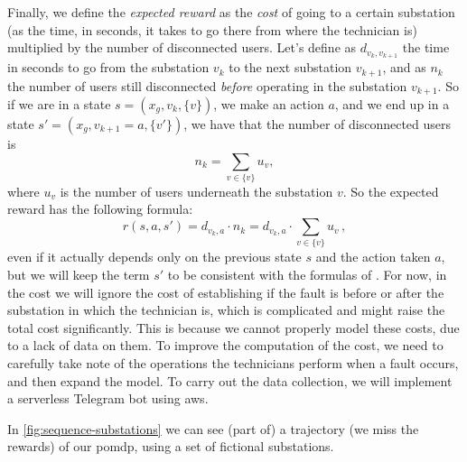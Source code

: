 Finally, we define the \emph{expected reward} as the \emph{cost} of going to a certain substation (as the time, in seconds, it takes to go there from where the technician is) multiplied by the number of disconnected users. Let's define as $d_{v_k, v_{k+1}}$ the time in seconds to go from the substation $v_k$ to the next substation $v_{k+1}$, and as $n_{k}$ the number of users still disconnected \emph{before} operating in the substation $v_{k+1}$. So if we are in a state $s = (x_g, v_k, \{v\})$, we make an action $a$, and we end up in a state $s' = (x_g, v_{k+1} = a, \{v'\})$, we have that the number of disconnected users is
\begin{equation}
    n_{k} = \sum_{v \in \{v\}} u_v,
\end{equation}
where $u_v$ is the number of users underneath the substation $v$. So the expected reward has the following formula:
\begin{equation}
    r(s, a, s') = d_{v_k, a} \cdot n_{k} = d_{v_k, a} \cdot \sum_{v \in \{v\}} u_v \, ,
    \label{eq:expected-reward}
\end{equation}
even if it actually depends only on the previous state $s$ and the action taken $a$, but we will keep the term $s'$ to be consistent with the formulas of \cite{SuttonBarto}.
For now, in the cost we will ignore the cost of establishing if the fault is before or after the substation in which the technician is, which is complicated and might raise the total cost significantly. This is because we cannot properly model these costs, due to a lack of data on them. To improve the computation of the cost, we need to carefully take note of the operations the technicians perform when a fault occurs, and then expand the model. To carry out the data collection, we will implement a serverless Telegram bot using \acrshort{aws}.

In \autoref{fig:sequence-substations} we can see (part of) a trajectory (we miss the rewards) of our \acrshort{pomdp}, using a set of fictional substations.

